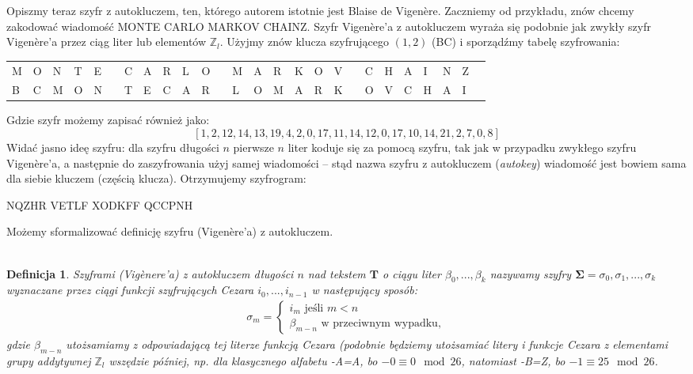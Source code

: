 \documentclass[a4paper]{article}
\theoremstyle{defn}
\newtheorem{defn}{Definicja}[subsection]
\theoremstyle{theorem}
\theoremstyle{lemma}
\theoremstyle{cor}
\theoremstyle{fact}
\begin{document}
Opiszmy teraz szyfr z autokluczem, ten, którego autorem istotnie jest Blaise de Vigenère. Zaczniemy od przykładu, znów chcemy zakodować wiadomość MONTE CARLO MARKOV CHAINZ. Szyfr Vigenère'a z autokluczem wyraża się podobnie jak zwykły szyfr Vigenère'a przez ciąg liter lub elementów $\mathbb{Z}_l$. Użyjmy znów klucza szyfrującego $(1, 2)$ (BC) i sporządźmy tabelę szyfrowania:
\begin{center}\begin{tabular}{|p{1.5mm}|p{1.5mm}|p{1.5mm}|p{1.5mm}|p{1.5mm}|p{1.5mm}|p{1.5mm}|p{1.5mm}|p{1.5mm}|p{1.5mm}|p{1.5mm}|p{1.5mm}|p{1.5mm}|p{1.5mm}|p{1.5mm}|p{1.5mm}|p{1.5mm}|p{1.5mm}|p{1.5mm}|p{1.5mm}|p{1.5mm}|p{1.5mm}|p{1.5mm}|p{1.5mm}|p{1.5mm}|p{1.5mm}|}
    M & O & N & T & E & & C & A & R & L & O & & M & A & R & K & O & V & & C & H & A & I & N & Z \\
    B & C & M & O & N & & T & E & C & A & R & & L & O & M & A & R & K & & O & V & C & H & A & I
\end{tabular}
\end{center}
Gdzie szyfr możemy zapisać również jako:
$$[1, 2, 12, 14, 13, 19, 4, 2, 0, 17, 11, 14, 12, 0, 17, 10, 14, 21, 2, 7, 0, 8]$$
Widać jasno ideę szyfru: dla szyfru długości $n$ pierwsze $n$ liter koduje się za pomocą szyfru, tak jak w przypadku zwykłego szyfru Vigenère'a, a następnie do zaszyfrowania użyj samej wiadomości – stąd nazwa szyfru z autokluczem (\textit{autokey}) wiadomość jest bowiem sama dla siebie kluczem (częścią klucza). Otrzymujemy szyfrogram:\\
\begin{center}
    NQZHR VETLF XODKFF QCCPNH
\end{center}
Możemy sformalizować definicję szyfru (Vigenère'a) z autokluczem. \\\\
\begin{defn}\label{defn4.2.2}
\textit{Szyframi (Vigènere'a) z autokluczem} długości $n$ nad tekstem $\boldsymbol{T}$ o ciągu liter $\beta_0, ..., \beta_k$ nazywamy szyfry $\boldsymbol{\Sigma} = \sigma_0, \sigma_1, ..., \sigma_k$ wyznaczane przez ciągi funkcji szyfrujących Cezara $i_0, ..., i_{n-1}$ w następujący sposób:
\begin{align*}
\sigma_m =
\begin{cases}
  i_m \text{ jeśli } m < n  \\
  \beta_{m-n} \text{ w przeciwnym wypadku},
\end{cases}
\end{align*}
gdzie $\beta_{m-n}$ utożsamiamy z odpowiadającą tej literze funkcją Cezara (podobnie będziemy utożsamiać litery i funkcje Cezara z elementami grupy addytywnej $\mathbb{Z}_l$ wszędzie później, np. dla klasycznego alfabetu -A=A, bo $-0 \equiv 0 \mod 26$, natomiast -B=Z, bo $-1 \equiv 25 \mod 26$.
\end{defn}\
\end{document}

